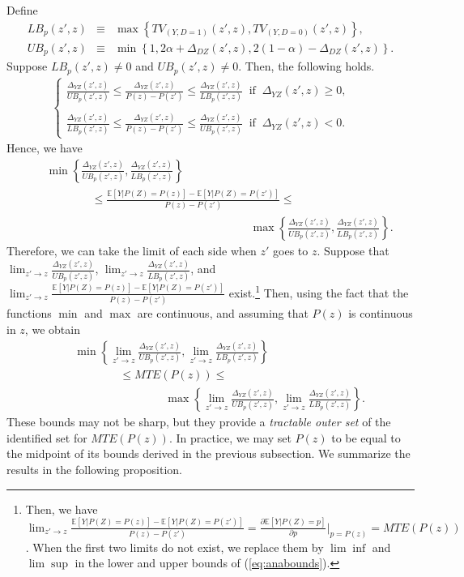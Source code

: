 \documentclass[11pt,reqno]{amsart}
\theoremstyle{plain}
\numberwithin{equation}{section}
\begin{document}
Define
\begin{eqnarray*}
LB_p(z',z) &\equiv& \max\left\{TV_{(Y,D=1)}(z',z), TV_{(Y,D=0)}(z',z)\right\},\\
UB_p(z',z) &\equiv& \min\left\{1,2\alpha+\Delta_{DZ}(z',z), 2(1-\alpha)-\Delta_{DZ}(z',z)\right\}.
\end{eqnarray*} 
Suppose $LB_p(z',z) \neq 0$ and $UB_p(z',z) \neq 0$. Then, the following holds. 
\begin{eqnarray*}
\left\{ \begin{array}{lcl}
     \frac{\Delta_{YZ}(z',z)}{UB_p(z',z)} \leq \frac{\Delta_{YZ}(z',z)}{P(z)-P(z')} \leq \frac{\Delta_{YZ}(z',z)}{LB_p(z',z)}\ \text{ if }\ \Delta_{YZ}(z',z) \geq 0,&&\\ \\
      \frac{\Delta_{YZ}(z',z)}{LB_p(z',z)} \leq \frac{\Delta_{YZ}(z',z)}{P(z)-P(z')}  \leq \frac{\Delta_{YZ}(z',z)}{UB_p(z',z)}\ \text{ if }\ \Delta_{YZ}(z',z) < 0.&&
     \end{array} \right.
\end{eqnarray*}
Hence, we have
\begin{eqnarray*}
&& \min\left\{\frac{\Delta_{YZ}(z',z)}{UB_p(z',z)},  \frac{\Delta_{YZ}(z',z)}{LB_p(z',z)}\right\}\\
&& \qquad \qquad \leq \frac{\mathbb E[Y\vert P(Z)=P(z)]-\mathbb E[Y\vert P(Z)=P(z')]}{P(z)-P(z')} \leq \\
&& \qquad \qquad \qquad \qquad \qquad \qquad \qquad \qquad \qquad \max\left\{\frac{\Delta_{YZ}(z',z)}{UB_p(z',z)},  \frac{\Delta_{YZ}(z',z)}{LB_p(z',z)}\right\}.
\end{eqnarray*}
Therefore, we can take the limit of each side when $z'$ goes to $z$. Suppose that $\lim_{z' \rightarrow z} \frac{\Delta_{YZ}(z',z)}{UB_p(z',z)}$, $\lim_{z' \rightarrow z} \frac{\Delta_{YZ}(z',z)}{LB_p(z',z)}$, and $\lim_{z' \rightarrow z} \frac{\mathbb E[Y\vert P(Z)=P(z)]-\mathbb E[Y\vert P(Z)=P(z')]}{P(z)-P(z')}$ exist.\footnote{Then, we have $\lim_{z' \rightarrow z} \frac{\mathbb E[Y\vert P(Z)=P(z)]-\mathbb E[Y\vert P(Z)=P(z')]}{P(z)-P(z')}=\frac{\partial \mathbb E[Y \vert P(Z)=p] }{\partial p}\vert_{p=P(z)}=MTE(P(z))$. When the first two limits do not exist, we replace them by $\lim\inf$ and $\lim\sup$ in the lower and upper bounds of (\ref{eq:anabounds}).} Then, using %
the fact that the functions $\min$ and $\max$ are continuous, and assuming that $P(z)$ is continuous in $z$, we obtain
\begin{eqnarray}
&& \min\left\{\lim_{z' \rightarrow z} \frac{\Delta_{YZ}(z',z)}{UB_p(z',z)},  \lim_{z' \rightarrow z} \frac{\Delta_{YZ}(z',z)}{LB_p(z',z)}\right\} \nonumber\\
&& \qquad \qquad \leq MTE(P(z))\leq \label{eq:anabounds}\\
&& \qquad \qquad \qquad \qquad \max\left\{\lim_{z' \rightarrow z} \frac{\Delta_{YZ}(z',z)}{UB_p(z',z)},  \lim_{z' \rightarrow z} \frac{\Delta_{YZ}(z',z)}{LB_p(z',z)}\right\}. \nonumber
\end{eqnarray}
These bounds may not be sharp, but they provide a \textit{tractable outer set} of the identified set for $MTE(P(z))$. In practice, we may set $P(z)$ to be equal to the midpoint of its bounds derived in the previous subsection. We summarize the results in the following proposition.
\end{document}
